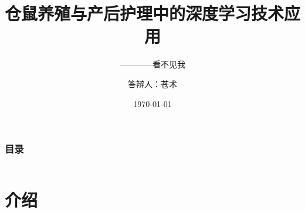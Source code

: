 \documentclass[presentation,aspectratio=1610]{beamer}
\title[国家网络安全学院]{仓鼠养殖与产后护理中的深度学习技术应用} %
\subtitle{————看不见我}
\author{答辩人：苍术} %
\institute[WHU]{指导老师：大仓鼠}%
\date{\today} %
\begin{document}
\begin{frame}
\titlepage %
\end{frame}

\begin{frame}
\frametitle{目录} %
    \begin{columns}[T]
    	
		\begin{column}{.45\textwidth}
				\centering
				\tableofcontents[sections={1-3}]
		\end{column}
		\begin{column}{.45\textwidth}
				\centering
			\tableofcontents[sections={4-7}]
		\end{column}
	\end{columns}
\end{frame}


\section{介绍} %

\end{document}
